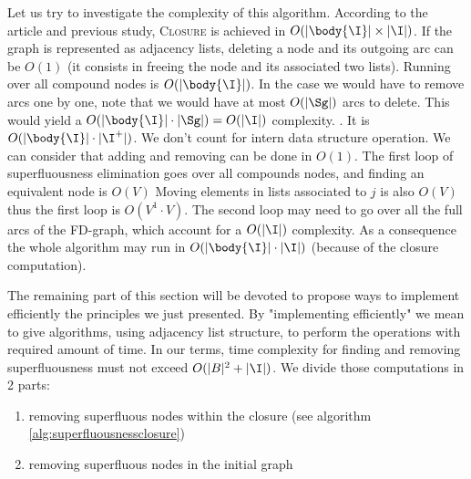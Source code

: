 Let us try to investigate the complexity of this algorithm. According to the 
article and previous study, \textsc{Closure} is achieved in $O(|\body{\I}| 
\times |\I|)$. If the graph is
represented as adjacency lists, deleting a node and its outgoing arc can be
$O(1)$ (it consists in freeing the node and its associated two lists). Running 
over all compound nodes is $O(|\body{\I}|)$. In the case we would have to 
remove arcs one by one, note that we would have at most $O(|\Sg|)$ arcs to 
delete. This would yield a $O(|\body{\I}| \cdot |\Sg|) = O(|\I|)$
complexity. . It is $O(|\body{\I}| \cdot 
|\I^{+}|)$. We don't count for intern data structure operation. We can consider
that adding and removing can be done in $O(1)$. The first loop of 
superfluousness elimination goes over all compounds nodes, and finding an 
equivalent node is $O(V)$ Moving elements in lists associated to $j$ is also
$O(V)$ thus the first loop is $O(V^1 \cdot V)$. The second loop may need to 
go over all the full arcs of the FD-graph, which account for a $O(|\I|)$ 
complexity. As a consequence the whole algorithm may run in $O(|\body{\I}| 
\cdot |\I|)$ (because of the closure computation).

\vspace{1.2em}

The remaining part of this section will be devoted to propose ways to 
implement efficiently the principles we just presented. By "implementing 
efficiently" we mean to give algorithms, using adjacency list structure, 
to perform the operations with required amount of time. In our terms, time 
complexity for finding and removing superfluousness must not exceed $O(|B|^2 + 
|\I|)$. We divide those computations in 2 parts:
\begin{enumerate}
	\item removing superfluous nodes within the closure (see algorithm 
	\ref{alg:superfluousnessclosure})
	\item removing superfluous nodes in the initial graph
\end{enumerate}

